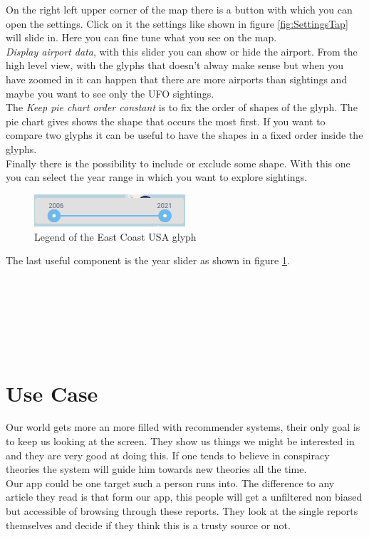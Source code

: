 \documentclass{article}
\begin{document}
On the right left upper corner of the map there is a button with which you can open the settings.
Click on it the settings like shown in figure \ref{fig:SettingsTap} will slide in. Here you can fine tune
what you see on the map. \\
\textit{Display airport data}, with this slider you can show or hide the airport. From the high level view,
with the glyphs that doesn't alway make sense but when you have zoomed in it can happen that there
are more airports than sightings and maybe you want to see only the UFO sightings.
\\
The \textit{Keep pie chart order constant} is to fix the order of shapes of the glyph. The pie chart gives
shows the shape that occurs the most first. If you want to compare two glyphs it can be useful to have the
shapes in a fixed order inside the glyphs.
\\
Finally there is the possibility to include or exclude some shape. With this one you can
select the year range in which you want to explore sightings. 
\\


\begin{figure} 
    \centering
    \includegraphics[width=0.5\textwidth]{yearSilder}
    \caption{Legend of the East Coast USA glyph}
    \label{fig:yearSilder}
\end{figure}

The last useful component is the year slider as shown in figure \ref{fig:yearSilder}. 
\\\\\\\\\\\\\\

\section*{Use Case}

Our world gets more an more filled with recommender systems, their only goal is to keep us looking at the screen. They show us things we might be interested in and they are very good at doing this. If one tends to believe in conspiracy theories the system will guide him towards new theories all the time.  \\
Our app could be one target such a person runs into. The difference to any article they read is that form our app, this people will get a unfiltered non biased but accessible of browsing through these reports. They look at the single reports themselves and decide if they think this is a trusty source or not. \\
\end{document}
